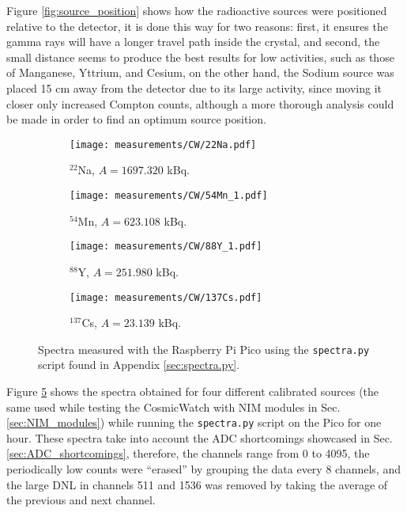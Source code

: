 Figure \ref{fig:source_position} shows how the radioactive sources were positioned relative to the detector, it is done this way for two reasons: first, it ensures the gamma rays will have a longer travel path inside the crystal, and second, the small distance seems to produce the best results for low activities, such as those of Manganese, Yttrium, and Cesium, on the other hand, the Sodium source was placed 15 \unit{\cm} away from the detector due to its large activity, since moving it closer only increased Compton counts, although a more thorough analysis could be made in order to find an optimum source position.

\begin{figure}
  \begin{subfigure}[t]{0.48\textwidth}
    \centering
    \texttt{[image: measurements/CW/22Na.pdf]}
    \caption{\label{sfig:CW_22Na}$^{22}$Na, $A=1697.320$ kBq.}
  \end{subfigure}
  \hfill
  \begin{subfigure}[t]{0.48\textwidth}
    \centering
    \texttt{[image: measurements/CW/54Mn\_1.pdf]}
    \caption{\label{sfig:C2_54Mn}$^{54}$Mn, $A=623.108$ kBq.}
  \end{subfigure}
  \medskip
  \begin{subfigure}[t]{0.48\textwidth}
    \centering
    \texttt{[image: measurements/CW/88Y\_1.pdf]}
    \caption{\label{sfig:CW_88Y}$^{88}$Y, $A=251.980$ kBq.}
  \end{subfigure}
  \hfill
  \begin{subfigure}[t]{0.48\textwidth}
    \centering
    \texttt{[image: measurements/CW/137Cs.pdf]}
    \caption{\label{sfig:CW_137Cs}$^{137}$Cs, $A=23.139$ kBq.}
  \end{subfigure}
  \caption{\label{fig:CW_spectra}Spectra measured with the Raspberry Pi Pico using the \texttt{spectra.py} script found in Appendix \ref{sec:spectra.py}.}
\end{figure}

Figure \ref{fig:CW_spectra} shows the spectra obtained for four different calibrated sources (the same used while testing the CosmicWatch with NIM modules in Sec. \ref{sec:NIM_modules}) while running the \texttt{spectra.py} script on the Pico for one hour. These spectra take into account the ADC shortcomings showcased in Sec. \ref{sec:ADC_shortcomings}, therefore, the channels range from 0 to 4095, the periodically low counts were ``erased'' by grouping the data every 8 channels, and the large DNL in channels 511 and 1536 was removed by taking the average of the previous and next channel. 

